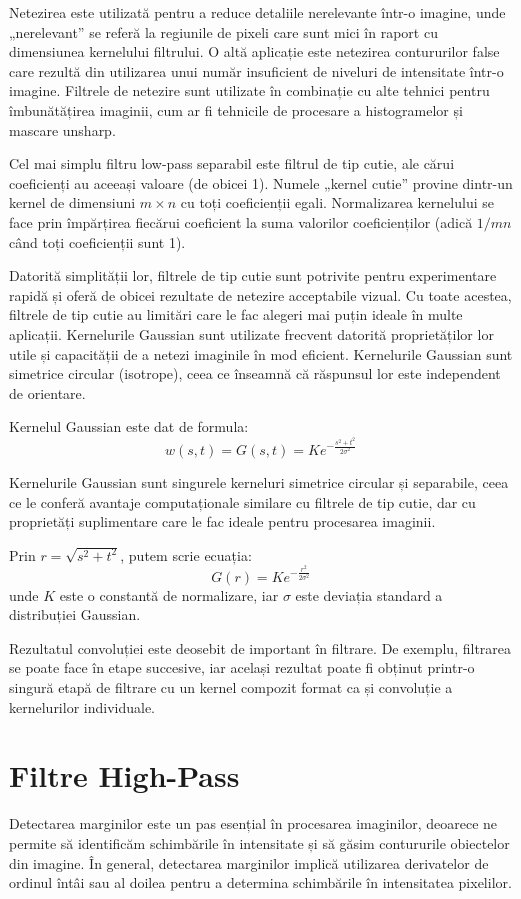 \documentclass[a4paper,12pt]{report}
\begin{document}
Netezirea este utilizată pentru a reduce detaliile nerelevante într-o imagine, unde „nerelevant” se referă la regiunile de pixeli care sunt mici în raport cu dimensiunea kernelului filtrului. O altă aplicație este netezirea contururilor false care rezultă din utilizarea unui număr insuficient de niveluri de intensitate într-o imagine. Filtrele de netezire sunt utilizate în combinație cu alte tehnici pentru îmbunătățirea imaginii, cum ar fi tehnicile de procesare a histogramelor și mascare unsharp.

Cel mai simplu filtru low-pass separabil este filtrul de tip cutie, ale cărui coeficienți au aceeași valoare (de obicei 1). Numele „kernel cutie” provine dintr-un kernel de dimensiuni \(m \times n\) cu toți coeficienții egali. Normalizarea kernelului se face prin împărțirea fiecărui coeficient la suma valorilor coeficienților (adică \(1 / mn\) când toți coeficienții sunt 1).

Datorită simplității lor, filtrele de tip cutie sunt potrivite pentru experimentare rapidă și oferă de obicei rezultate de netezire acceptabile vizual. Cu toate acestea, filtrele de tip cutie au limitări care le fac alegeri mai puțin ideale în multe aplicații. Kernelurile Gaussian sunt utilizate frecvent datorită proprietăților lor utile și capacității de a netezi imaginile în mod eficient. Kernelurile Gaussian sunt simetrice circular (isotrope), ceea ce înseamnă că răspunsul lor este independent de orientare.

Kernelul Gaussian este dat de formula:
\[
    w(s,t) = G(s,t) = K e^{-\frac{s^2 + t^2}{2\sigma^2}}
\]

Kernelurile Gaussian sunt singurele kerneluri simetrice circular și separabile, ceea ce le conferă avantaje computaționale similare cu filtrele de tip cutie, dar cu proprietăți suplimentare care le fac ideale pentru procesarea imaginii.

Prin \(r = \sqrt{s^2 + t^2}\), putem scrie ecuația:
\[
    G(r) = K e^{-\frac{r^2}{2\sigma^2}}
\]
unde \(K\) este o constantă de normalizare, iar \(\sigma\) este deviația standard a distribuției Gaussian.

Rezultatul convoluției este deosebit de important în filtrare. De exemplu, filtrarea se poate face în etape succesive, iar același rezultat poate fi obținut printr-o singură etapă de filtrare cu un kernel compozit format ca și convoluție a kernelurilor individuale.

\section{Filtre High-Pass}
Detectarea marginilor este un pas esențial în procesarea imaginilor, deoarece ne permite să identificăm schimbările în intensitate și să găsim contururile obiectelor din imagine. În general, detectarea marginilor implică utilizarea derivatelor de ordinul întâi sau al doilea pentru a determina schimbările în intensitatea pixelilor.
\end{document}
